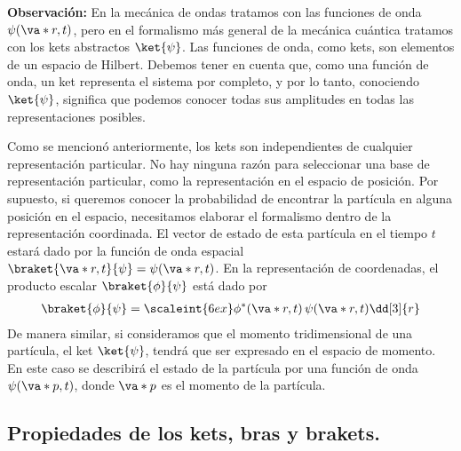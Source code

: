 \textbf{Observación:} En la mecánica de ondas tratamos con las funciones de onda $\psi(\va*{r}, t)$, pero en el formalismo más general de la mecánica cuántica tratamos con los kets abstractos $\ket{\psi}$. Las funciones de onda, como kets, son elementos de un espacio de Hilbert. Debemos tener en cuenta que, como una función de onda, un ket representa el sistema por completo, y por lo tanto, conociendo $\ket{\psi}$, significa que podemos conocer todas sus amplitudes en todas las representaciones posibles.
\par
Como se mencionó anteriormente, los kets son independientes de cualquier representación particular. No hay ninguna razón para seleccionar una base de representación particular, como la representación en el espacio de posición. Por supuesto, si queremos conocer la probabilidad de encontrar la partícula en alguna posición en el espacio, necesitamos elaborar el formalismo dentro de la representación coordinada. El vector de estado de esta partícula en el tiempo $t$ estará dado por la función de onda espacial $\braket{\va*{r}, t}{\psi} = \psi(\va*{r}, t)$. En la representación de coordenadas, el producto escalar $\braket{\phi}{\psi}$ está dado por
\begin{align}
\braket{\phi}{\psi} = \scaleint{6ex} \phi^{*}(\va*{r}, t) \, \psi(\va*{r}, t) \dd[3]{r}
\label{eq:ecuacion_02_25}
\end{align}
De manera similar, si consideramos que el momento tridimensional de una partícula, el ket $\ket{\psi}$, tendrá que ser expresado en el espacio de momento. En este caso se describirá el estado de la partícula por una función de onda $\psi( \va*{p}, t)$, donde $\va*{p}$ es el momento de la partícula.

\subsection{Propiedades de los kets, bras y brakets.}

